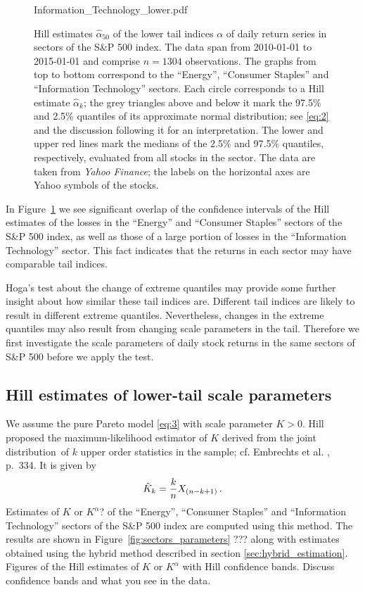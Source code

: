 \documentclass[11pt,a4]{amsart}
\newcommand{\red}{\color{darkred}}
\newcommand{\blue}{\color{darkblue}}
\newcommand{\beao}{\begin{eqnarray*}}
\newcommand{\eeao}{\end{eqnarray*}\noindent}
\newcommand{\ds}{distribution}
\newcommand{\1}{{\mathbf 1}}
\begin{document}
\begin{figure}[htb!]
\begin{minipage}{1.0\linewidth}
    {Information_Technology_lower.pdf}
  \end{minipage}
  \caption{\small Hill estimates $\hat \alpha_{50}$ of the lower tail indices $\alpha$ of
    daily return series in sectors of the S\&P 500
    index. The data span
    from 2010-01-01 to 2015-01-01 and comprise $n=1304$ observations.
The graphs from top to bottom correspond to the ``Energy'',
    ``Consumer Staples'' and ``Information Technology'' sectors.
    Each circle corresponds to a Hill estimate $\hat\alpha_k$; the grey
    triangles above and below it mark the 97.5\% and 2.5\% quantiles
    of its approximate normal distribution; see \eqref{eq:2} and the discussion following it for an 
interpretation.
    The lower and upper red lines mark the medians of the 2.5\% 
    and 97.5\% quantiles, respectively, evaluated from all stocks in the sector.
    The data are taken from {\it Yahoo Finance}; the labels on
    the horizontal axes are Yahoo symbols of the stocks. 
  }\label{fig:1}
\end{figure}

In Figure~\ref{fig:1} we see significant overlap of the confidence intervals of the Hill
estimates of the losses in the ``Energy'' and ``Consumer Staples''
sectors of the S\&P 500 index, as well as those of a 
large portion of losses in the ``Information Technology'' sector.
This fact indicates that the returns in each sector may 
have comparable tail indices.
\par
Hoga's \cite{hoga:2016} test about the change of extreme quantiles
may provide some further insight about how similar these tail indices are.
Different tail indices are likely to result in different
extreme quantiles. Nevertheless, changes in the extreme quantiles may also
result from changing scale parameters in the tail. Therefore  we first investigate the scale
parameters of daily stock returns in the same sectors of S\&P 500 before we apply the test.


\subsection{Hill estimates of lower-tail scale parameters}\label{sec:HillScaleEstimates}
We assume the pure Pareto model \eqref{eq:3} with scale parameter $K>0$. 
Hill \cite{hill1975simple} proposed  the maximum-likelihood estimator of $K$
derived from the joint \ds\ of $k$ upper order statistics in the sample; cf.
Embrechts et al. \cite{embrechts:klueppelberg:mikosch:1997}, p.~334.
It is given by
\beao
\hat K_k = {k \over n} X_{(n-k+1)}\,.
\eeao
Estimates of $K$ {\red or $K^\alpha$?} of the ``Energy'', ``Consumer Staples'' and
``Information Technology'' sectors of the S\&P 500 index are computed
using this method. {\blue The results are shown in Figure~\ref{fig:sectors_parameters} {\red ???} along with estimates obtained
using the hybrid method described in section
\ref{sec:hybrid_estimation}.} {\red Figures of the Hill estimates of $K$ or $K^\alpha$ with Hill confidence bands. 
Discuss confidence bands and what you see in the data.}
\end{document}
